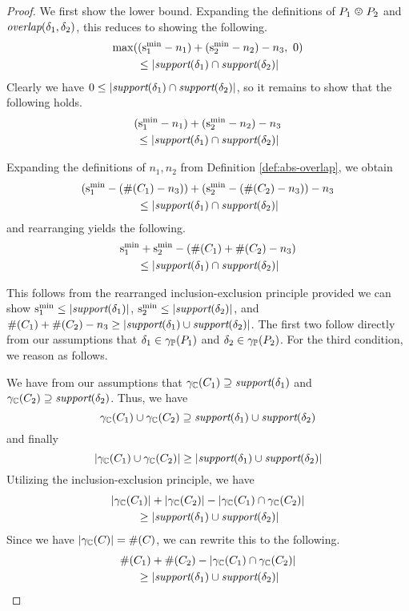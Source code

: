 \begin{proof}
We first show the lower bound.  Expanding the definitions of $\pessoverlap{\ppa}{\ppb}$ and $\textit{overlap}(\delta_1,\delta_2)$, this reduces to showing the following.
\begin{multline*}
\max((\mathrm{s}^\mathrm{min}_{1} - n_1) + (\mathrm{s}^\mathrm{min}_{2} - n_2) - n_3,\ 0)\\
{} \leq \left| \textit{support}(\delta_1) \cap \textit{support}(\delta_2) \right|
\end{multline*}
Clearly we have $0 \leq \left| \textit{support}(\delta_1) \cap \textit{support}(\delta_2) \right|$, so it remains to show that the following holds.
\begin{multline*}
(\mathrm{s}^\mathrm{min}_{1} - n_1) + (\mathrm{s}^\mathrm{min}_{2} - n_2) - n_3\\
{} \leq \left| \textit{support}(\delta_1) \cap \textit{support}(\delta_2) \right|
\end{multline*}

Expanding the definitions of $n_1,n_2$ from Definition \ref{def:abs-overlap}, we obtain
\begin{multline*}
(\mathrm{s}^\mathrm{min}_{1} - (\#(C_{1}) - n_3)) + (\mathrm{s}^\mathrm{min}_{2} - (\#(C_{2}) - n_3)) - n_3\\
{} \leq \left| \textit{support}(\delta_1) \cap \textit{support}(\delta_2) \right|
\end{multline*}
and rearranging yields the following.
\begin{multline*}
\mathrm{s}^\mathrm{min}_{1} + \mathrm{s}^\mathrm{min}_{2} - (\#(C_{1}) + \#(C_{2}) - n_3)\\
{} \leq \left| \textit{support}(\delta_1) \cap \textit{support}(\delta_2) \right|
\end{multline*}

This follows from the rearranged inclusion-exclusion principle provided we can show $\mathrm{s}^\mathrm{min}_{1} \leq \left| \textit{support}(\delta_1) \right|$, $\mathrm{s}^\mathrm{min}_{2} \leq \left| \textit{support}(\delta_2) \right|$, and $\#(C_{1}) + \#(C_{2}) - n_3 \geq \left| \textit{support}(\delta_1) \cup \textit{support}(\delta_2) \right|$.  The first two follow directly from our assumptions that $\delta_1 \in \gamma_{\mathbb{P}}(P_{1})$ and $\delta_2 \in \gamma_{\mathbb{P}}(P_{2})$.  For the third condition, we reason as follows.

We have from our assumptions that $\gamma_{\mathbb{C}}(C_{1}) \supseteq \textit{support}(\delta_1)$ and $\gamma_{\mathbb{C}}(C_{2}) \supseteq \textit{support}(\delta_2)$.  Thus, we have
\[\gamma_{\mathbb{C}}(C_{1}) \cup \gamma_{\mathbb{C}}(C_{2}) \supseteq \textit{support}(\delta_1) \cup \textit{support}(\delta_2)\]
and finally
\[\left| \gamma_{\mathbb{C}}(C_{1}) \cup \gamma_{\mathbb{C}}(C_{2}) \right| \geq \left| \textit{support}(\delta_1) \cup \textit{support}(\delta_2) \right|\]
Utilizing the inclusion-exclusion principle, we have
\begin{multline*}
\left| \gamma_{\mathbb{C}}(C_{1}) \right| + \left| \gamma_{\mathbb{C}}(C_{2}) \right| - \left| \gamma_{\mathbb{C}}(C_{1}) \cap \gamma_{\mathbb{C}}(C_{2}) \right|\\
{} \geq \left| \textit{support}(\delta_1) \cup \textit{support}(\delta_2) \right|
\end{multline*}
Since we have $\left| \gamma_{\mathbb{C}}(C_{}) \right| = \#(C_{})$, we can rewrite this to the following.
\begin{multline*}
\#(C_{1}) + \#(C_{2}) - \left| \gamma_{\mathbb{C}}(C_{1}) \cap \gamma_{\mathbb{C}}(C_{2}) \right|\\
{} \geq \left| \textit{support}(\delta_1) \cup \textit{support}(\delta_2) \right|
\end{multline*}


\end{proof}
